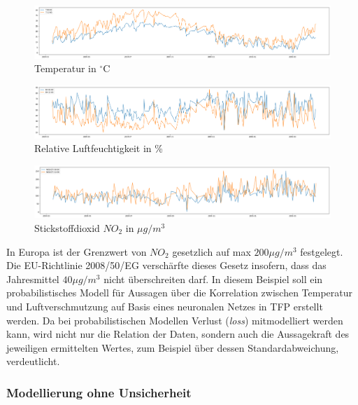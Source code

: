 \documentclass[12pt]{article}
\begin{document}
\begin{figure}[h]
    \centering
    \includegraphics[width=1.0\textwidth]{./figs/temp.png}
    \caption{Temperatur in $^\circ\text{C}$}
    \label{fig:temp}
\end{figure}

\begin{figure}[h]
    \centering
    \includegraphics[width=1.0\textwidth]{./figs/rh.png}
    \caption{Relative Luftfeuchtigkeit in \%}
    \label{fig:rh}
\end{figure}

\begin{figure}[h]
    \centering
    \includegraphics[width=1.0\textwidth]{./figs/no2.png}
    \caption{Stickstoffdioxid $NO_2$ in ${\mu g/m^3}$}
    \label{fig:no2}
\end{figure}

In Europa ist der Grenzwert von $NO_2$ gesetzlich auf max $200{\mu g/m^3}$ festgelegt. Die EU-Richtlinie 2008/50/EG verschärfte dieses Gesetz insofern, dass das Jahresmittel $40{\mu g/m^3}$ nicht überschreiten darf. In diesem Beispiel soll ein probabilistisches Modell für Aussagen über die Korrelation zwischen Temperatur und Luftverschmutzung auf Basis eines neuronalen Netzes in TFP erstellt werden. Da bei probabilistischen Modellen Verlust (\textit{loss}) mitmodelliert werden kann, wird nicht nur die Relation der Daten, sondern auch die Aussagekraft des jeweiligen ermittelten Wertes, zum Beispiel über dessen Standardabweichung, verdeutlicht.

\subsubsection{Modellierung ohne Unsicherheit}
\label{sec:no_unc}
\end{document}
